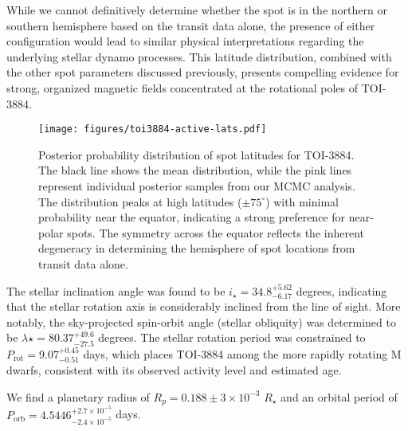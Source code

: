 \documentclass[twocolumn]{aastex631}
\begin{document}
While we cannot definitively determine whether the spot is in the northern or southern hemisphere based on the transit data alone, 
the presence of either configuration would lead to similar physical interpretations regarding the underlying stellar dynamo processes. 
This latitude distribution, combined with the other spot parameters discussed previously, presents compelling evidence for strong, 
organized magnetic fields concentrated at the rotational poles of TOI-3884.
%
\begin{figure*}[hbt!]
    \centering
    \texttt{[image: figures/toi3884-active-lats.pdf]}
    \caption{Posterior probability distribution of spot latitudes for TOI-3884. The black line shows the mean distribution, 
    while the pink lines represent individual posterior samples from our MCMC analysis. The distribution peaks at high latitudes 
    ($\pm75^{\circ}$) with minimal probability near the equator, indicating a strong preference for near-polar spots.
    The symmetry across 
    the equator reflects the inherent degeneracy in determining the hemisphere of spot locations from transit data alone.}
    \label{fig:spot_latitudes}
\end{figure*}
%

The stellar inclination angle was found to be $i_\star = {34.8}^{+5.62}_{-6.17}$ degrees, indicating that the stellar rotation 
axis is considerably inclined from the line of sight. More notably, the sky-projected spin-orbit angle (stellar obliquity) was 
determined to be $\lambda\star = {80.37}^{+49.6}_{-27.5}$ degrees.
The stellar rotation period was constrained to $P_\text{rot} = 9.07^{+0.45}_{-0.51}$ days, which places TOI-3884 among the 
more rapidly rotating M dwarfs, consistent with its observed activity level and estimated age.

We find a planetary radius of $R_p = 0.188 \pm 3\times10^{-3}$ $R_\star$ and an orbital period of 
$P_\text{orb} = 4.5446^{+2.7\times10^{-5}}_{-2.4\times10^{-5}}$ days. 
\end{document}
